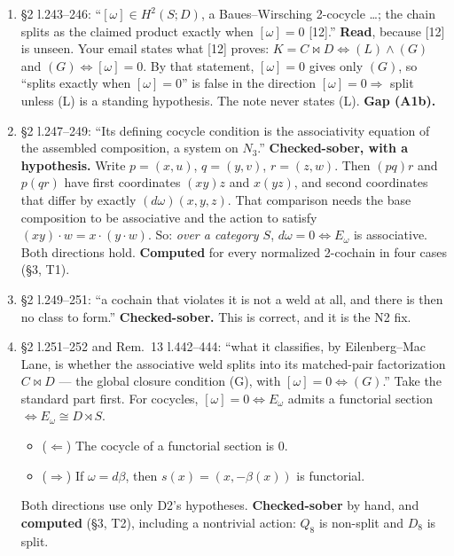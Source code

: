 \documentclass[11pt]{article}
\begin{document}
\begin{enumerate}[label=\textbf{D\arabic*},leftmargin=*]
\item \S2 l.243--246: ``$[\omega]\in H^2(S;D)$, a Baues--Wirsching 2-cocycle \dots; the chain splits
as the claimed product exactly when $[\omega]=0$ [12].'' \textbf{Read}, because [12] is unseen. Your
email states what [12] proves: $K=C\bowtie D\iff(L)\wedge(G)$ and $(G)\iff[\omega]=0$. By that
statement, $[\omega]=0$ gives only $(G)$, so ``splits exactly when $[\omega]=0$'' is false in the
direction $[\omega]=0\Rightarrow$ split unless (L) is a standing hypothesis. The note never states (L).
\textbf{Gap (A1b).}
\item \S2 l.247--249: ``Its defining cocycle condition is the associativity equation of the assembled
composition, a system on $N_3$.'' \textbf{Checked-sober, with a hypothesis.} Write $p=(x,u)$,
$q=(y,v)$, $r=(z,w)$. Then $(pq)r$ and $p(qr)$ have first coordinates $(xy)z$ and $x(yz)$, and second
coordinates that differ by exactly $(d\omega)(x,y,z)$. That comparison needs the base composition to
be associative and the action to satisfy $(xy)\cdot w=x\cdot(y\cdot w)$. So: \emph{over a category
$S$}, $d\omega=0\iff E_\omega$ is associative. Both directions hold. \textbf{Computed} for every
normalized 2-cochain in four cases (\S3, T1).
\item \S2 l.249--251: ``a cochain that violates it is not a weld at all, and there is then no class to
form.'' \textbf{Checked-sober.} This is correct, and it is the N2 fix.
\item \S2 l.251--252 and Rem.~13 l.442--444: ``what it classifies, by Eilenberg--Mac Lane, is whether
the associative weld splits into its matched-pair factorization $C\bowtie D$ --- the global closure
condition (G), with $[\omega]=0\Leftrightarrow(G)$.'' Take the standard part first. For cocycles,
$[\omega]=0\iff E_\omega$ admits a functorial section $\iff E_\omega\cong D\rtimes S$.
\begin{itemize}[leftmargin=1.2em]
\item ($\Leftarrow$) The cocycle of a functorial section is $0$.
\item ($\Rightarrow$) If $\omega=d\beta$, then $s(x)=(x,-\beta(x))$ is functorial.
\end{itemize}
Both directions use only D2's hypotheses. \textbf{Checked-sober} by hand, and \textbf{computed}
(\S3, T2), including a nontrivial action: $Q_8$ is non-split and $D_8$ is split.


\end{enumerate}
\end{document}

